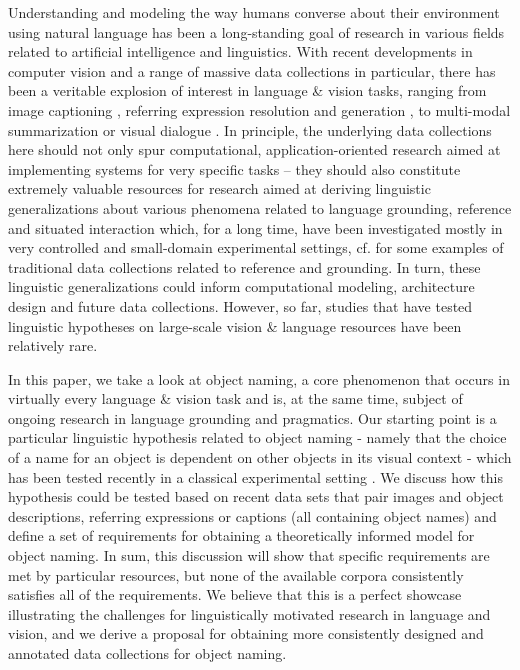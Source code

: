 \documentclass[runningheads]{llncs}
\begin{document}
Understanding and modeling the way humans converse about their environment using natural language has been a long-standing goal of research in various fields related to artificial intelligence and linguistics.
With recent  developments in computer vision and a range of massive data collections in particular, there has been a veritable explosion of interest in language \& vision tasks, ranging from image captioning \cite{fangetal:2015,devlin:imcaqui,chen2015mind,vinyals:show,Bernardietal:automatic}, referring expression resolution and generation \cite{Kazemzadeh2014,mao15,Yu2016,schlazar:acl16}, to multi-modal summarization or visual dialogue \cite{das2017visual,vries2017guesswhat}.
In principle, the underlying data collections here should not only spur computational, application-oriented research aimed at implementing systems for very specific tasks -- they should also constitute extremely valuable resources for research aimed at deriving linguistic generalizations about various phenomena related to language grounding, reference and situated interaction which, for a long time, have been investigated mostly in very controlled and small-domain experimental settings, cf. \cite{anderson1991hcrc,fernangen:sigd07,krahmer:2012,takenobu2012rex,zarriess2016pentoref} for some examples of traditional data collections related to reference and grounding.  
In turn, these linguistic generalizations could inform computational modeling, architecture design and future data collections.
However, so far, studies that have tested linguistic hypotheses on large-scale vision \& language resources have been relatively rare. 


In this paper, we take a look at object naming, a core phenomenon that occurs in virtually every language \& vision task and is, at the same time, subject of ongoing research in language grounding and pragmatics. 
Our starting point is a particular linguistic hypothesis related to object naming - namely that the choice of a name for an object is dependent on other objects in its visual context - which has been tested recently in a classical experimental setting \cite{graf2016animal}. 
We discuss how this hypothesis could be tested based on recent data sets that pair images and object descriptions, referring expressions or captions (all containing object names) and define a set of requirements for obtaining a theoretically informed model for object naming.
In sum, this discussion will show that specific requirements are met by particular resources, but none of the available corpora consistently satisfies all of the requirements.
We believe that this is a perfect showcase illustrating the challenges for linguistically motivated research in language and vision, and we derive a proposal for obtaining more consistently designed and annotated data collections for object naming.
\end{document}
